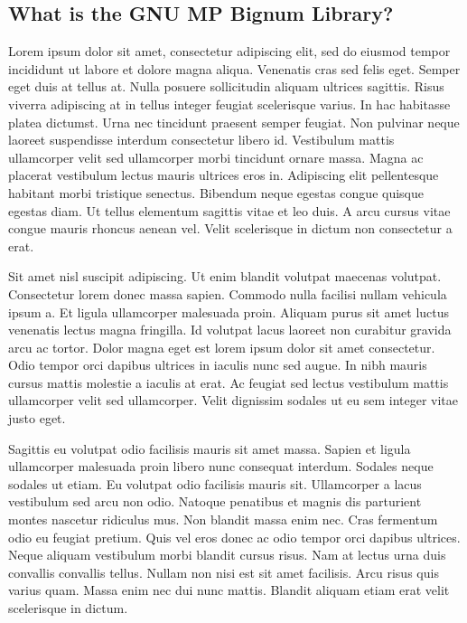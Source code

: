 \documentclass[12pt]{article}
\begin{document}
\subsection{What is the GNU MP Bignum Library?}
Lorem ipsum dolor sit amet, consectetur adipiscing elit, sed do eiusmod tempor incididunt ut labore et dolore magna aliqua. Venenatis cras sed felis eget. Semper eget duis at tellus at. Nulla posuere sollicitudin aliquam ultrices sagittis. Risus viverra adipiscing at in tellus integer feugiat scelerisque varius. In hac habitasse platea dictumst. Urna nec tincidunt praesent semper feugiat. Non pulvinar neque laoreet suspendisse interdum consectetur libero id. Vestibulum mattis ullamcorper velit sed ullamcorper morbi tincidunt ornare massa. Magna ac placerat vestibulum lectus mauris ultrices eros in. Adipiscing elit pellentesque habitant morbi tristique senectus. Bibendum neque egestas congue quisque egestas diam. Ut tellus elementum sagittis vitae et leo duis. A arcu cursus vitae congue mauris rhoncus aenean vel. Velit scelerisque in dictum non consectetur a erat.\par
Sit amet nisl suscipit adipiscing. Ut enim blandit volutpat maecenas volutpat. Consectetur lorem donec massa sapien. Commodo nulla facilisi nullam vehicula ipsum a. Et ligula ullamcorper malesuada proin. Aliquam purus sit amet luctus venenatis lectus magna fringilla. Id volutpat lacus laoreet non curabitur gravida arcu ac tortor. Dolor magna eget est lorem ipsum dolor sit amet consectetur. Odio tempor orci dapibus ultrices in iaculis nunc sed augue. In nibh mauris cursus mattis molestie a iaculis at erat. Ac feugiat sed lectus vestibulum mattis ullamcorper velit sed ullamcorper. Velit dignissim sodales ut eu sem integer vitae justo eget.\par
Sagittis eu volutpat odio facilisis mauris sit amet massa. Sapien et ligula ullamcorper malesuada proin libero nunc consequat interdum. Sodales neque sodales ut etiam. Eu volutpat odio facilisis mauris sit. Ullamcorper a lacus vestibulum sed arcu non odio. Natoque penatibus et magnis dis parturient montes nascetur ridiculus mus. Non blandit massa enim nec. Cras fermentum odio eu feugiat pretium. Quis vel eros donec ac odio tempor orci dapibus ultrices. Neque aliquam vestibulum morbi blandit cursus risus. Nam at lectus urna duis convallis convallis tellus. Nullam non nisi est sit amet facilisis. Arcu risus quis varius quam. Massa enim nec dui nunc mattis. Blandit aliquam etiam erat velit scelerisque in dictum.\par
\end{document}
